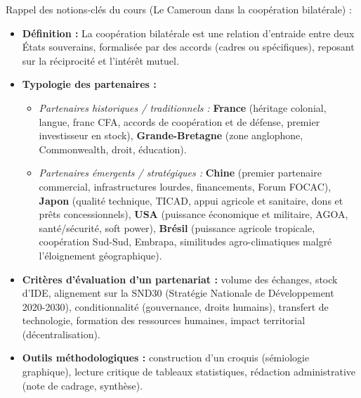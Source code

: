 \documentclass[11pt]{article}
\newcommand{\cle}[1]{{\popxbold\color{popdark}#1}}
\newcounter{popsec}
\newcounter{popsub}
\newcommand{\courssub}[1]{%
  \stepcounter{popsub}%
  \par\vspace{9pt}\noindent{\popxbold\fontsize{11.5}{13}\selectfont\color{popink}{\color{poporange}\thepopsec.\thepopsub}\hspace{6pt}#1}\par\nopagebreak\vspace{4pt}
}
\begin{document}
\courssub{Ressources à mobiliser}
\noindent Rappel des notions-clés du cours (Le Cameroun dans la coopération bilatérale) :
\begin{itemize}
    \item \textbf{Définition :} La \cle{coopération bilatérale} est une relation d'entraide entre deux États souverains, formalisée par des accords (cadres ou spécifiques), reposant sur la réciprocité et l'intérêt mutuel.
    \item \textbf{Typologie des partenaires :}
    \begin{itemize}
        \item \textit{Partenaires historiques / traditionnels :} \textbf{France} (héritage colonial, langue, franc CFA, accords de coopération et de défense, premier investisseur en stock), \textbf{Grande-Bretagne} (zone anglophone, Commonwealth, droit, éducation).
        \item \textit{Partenaires émergents / stratégiques :} \textbf{Chine} (premier partenaire commercial, infrastructures lourdes, financements, Forum FOCAC), \textbf{Japon} (qualité technique, TICAD, appui agricole et sanitaire, dons et prêts concessionnels), \textbf{USA} (puissance économique et militaire, AGOA, santé/sécurité, soft power), \textbf{Brésil} (puissance agricole tropicale, coopération Sud-Sud, Embrapa, similitudes agro-climatiques malgré l'éloignement géographique).
    \end{itemize}
    \item \textbf{Critères d'évaluation d'un partenariat :} volume des échanges, stock d'IDE, alignement sur la \cle{SND30} (Stratégie Nationale de Développement 2020-2030), conditionnalité (gouvernance, droits humains), transfert de technologie, formation des ressources humaines, impact territorial (décentralisation).
    \item \textbf{Outils méthodologiques :} construction d'un croquis (sémiologie graphique), lecture critique de tableaux statistiques, rédaction administrative (note de cadrage, synthèse).
\end{itemize}
\end{document}
